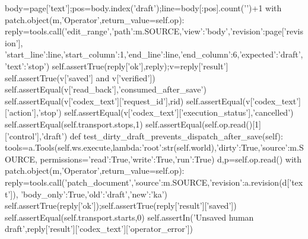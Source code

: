   body=page['text'];pos=body.index('draft');line=body[:pos].count('\n')+1
  with patch.object(m,'Operator',return_value=self.op):
   reply=tools.call('edit_range',{'path':m.SOURCE,'view':'body','revision':page['revision'],
      'start_line':line,'start_column':1,'end_line':line,'end_column':6,'expected':'draft','text':'stop'})
  self.assertTrue(reply['ok'],reply);v=reply['result']
  self.assertTrue(v['saved'] and v['verified'])
  self.assertEqual(v['read_back'],'consumed_after_save')
  self.assertEqual(v['codex_text']['request_id'],rid)
  self.assertEqual(v['codex_text']['action'],'stop')
  self.assertEqual(v['codex_text']['execution_status'],'cancelled')
  self.assertEqual(self.transport.stops,1)
  self.assertEqual(self.op.read()[1]['control'],'draft')
 def test_dirty_draft_prevents_dispatch_after_save(self):
  tools=a.Tools(self.ws.execute,lambda:{'root':str(self.world),'dirty':True,'source':m.SOURCE},
                permissions={'read':True,'write':True,'run':True})
  d,p=self.op.read()
  with patch.object(m,'Operator',return_value=self.op):
   reply=tools.call('patch_document',{'source':m.SOURCE,'revision':a.revision(d['text']),
          'body_only':True,'old':'draft','new':'ka'})
  self.assertTrue(reply['ok']);self.assertTrue(reply['result']['saved'])
  self.assertEqual(self.transport.starts,0)
  self.assertIn('Unsaved human draft',reply['result']['codex_text']['operator_error'])

